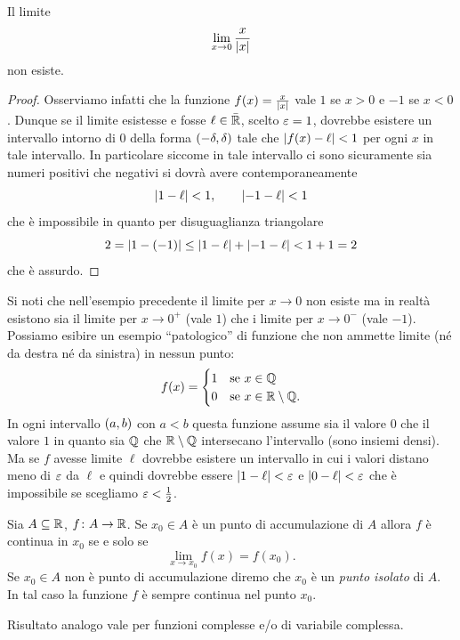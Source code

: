 \begin{example}
Il limite 
\[
  \lim_{x\to 0} \frac{x}{{\left|x\right|}}
\]
non esiste. 
\end{example}
\begin{proof}
Osserviamo infatti che la funzione $f(x) = \frac{x}{{\left|x\right|}}$ 
vale $1$ se $x>0$ e $-1$ se $x<0$.
Dunque se il limite esistesse e fosse $\ell\in \bar {{\mathbb R}}$, 
scelto $\varepsilon=1$, dovrebbe esistere un intervallo intorno di $0$ 
della forma $\left(-\delta,\delta\right)$ tale che 
${\left|f(x)-\ell\right|}<1$ per ogni $x$ in tale intervallo.
In particolare siccome in tale intervallo ci sono sicuramente 
sia numeri positivi che negativi si dovrà avere 
contemporaneamente
\[
  {\left|1-\ell\right|}<1, \qquad 
  {\left|-1-\ell\right|}<1  
\]
che è impossibile in quanto per disuguaglianza triangolare 
\[
 2 = {\left|1-(-1)\right|} 
 \le {\left|1-\ell\right|} + {\left|-1-\ell\right|}
 < 1 + 1 = 2
\]
che è assurdo.
\end{proof}

Si noti che nell'esempio precedente il limite per $x\to 0$ 
non esiste ma in realtà esistono sia il limite per $x\to 0^+$ 
(vale $1$) che i limite per $x\to 0^-$ (vale $-1$).
Possiamo esibire un esempio ``patologico'' di funzione 
che non ammette limite (né da destra né da sinistra)
in nessun punto:
\[
  f(x) = 
  \begin{cases}
     1 & \text{se $x\in {\mathbb Q}$}\\ 
     0 & \text{se $x\in {\mathbb R}\setminus {\mathbb Q}$}.
  \end{cases}
\]
In ogni intervallo $\left(a,b\right)$ con $a<b$ questa funzione 
assume sia il valore $0$ che il valore $1$ 
in quanto sia ${\mathbb Q}$ che ${\mathbb R}\setminus {\mathbb Q}$ intersecano 
l'intervallo (sono insiemi densi).
Ma se $f$ avesse limite $\ell$ dovrebbe esistere un intervallo 
in cui i valori distano meno di $\varepsilon$ da $\ell$ e quindi 
dovrebbe essere ${\left|1-\ell\right|}<\varepsilon$ e ${\left|0-\ell\right|}<\varepsilon$
che è impossibile se scegliamo $\varepsilon < \frac 1 2$.

\begin{theorem}%
\mymark{***}%
  Sia $A\subseteq {\mathbb R}$, $f\colon A \to {\mathbb R}$. 
  Se $x_0\in A$ è un punto di accumulazione di $A$
  allora $f$ è continua in $x_0$ se e solo se
  \[
    \lim_{x\to x_0}f(x) = f(x_0).
  \]
  Se $x_0\in A$ non è punto di accumulazione diremo 
  che $x_0$ è un \emph{punto isolato}%
%
 di $A$.
  In tal caso la funzione $f$ è sempre continua nel punto $x_0$.

Risultato analogo vale per funzioni complesse e/o di variabile complessa.
\end{theorem}
  
